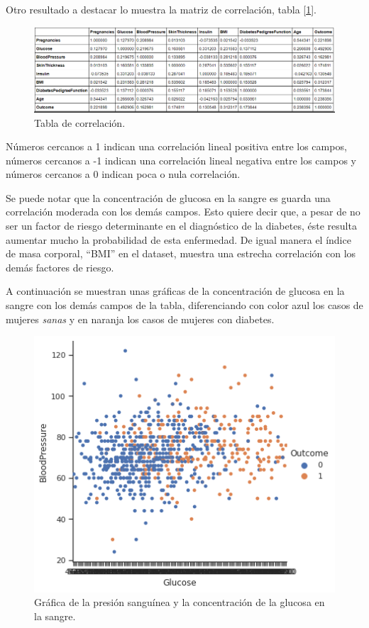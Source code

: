\documentclass{article}
\begin{document}
Otro resultado a destacar lo muestra la matriz de correlación, tabla [\ref{fig:corr}].

\begin{figure}[H]
	\centering
	\includegraphics[width=0.9\linewidth]{corr.png}
	\caption{Tabla de correlación.}%
	\label{fig:corr}
\end{figure}

Números cercanos a 1 indican una correlación lineal positiva entre los campos, números cercanos a -1 indican una correlación lineal negativa entre los campos y números cercanos a 0 indican poca o nula correlación.

Se puede notar que la concentración de glucosa en la sangre es guarda una correlación moderada con los demás campos. Esto quiere decir que, a pesar de no ser un factor de riesgo determinante en el diagnóstico de la diabetes, éste resulta aumentar mucho la probabilidad de esta enfermedad. De igual manera el índice de masa corporal, ``BMI'' en el dataset, muestra una estrecha correlación con los demás factores de riesgo. 

A continuación se muestran unas gráficas de la concentración de glucosa en la sangre con los demás campos de la tabla, diferenciando con color azul los casos de mujeres \emph{sanas} y en naranja los casos de mujeres con diabetes.

\begin{figure}[H]
	\centering
	\includegraphics[width=0.65\linewidth]{BloodPressure_Glucose.png}
	\caption{Gráfica de la presión sanguínea y la concentración de la glucosa en la sangre.}%
	\label{fig:BloodPressure_Glucose}
\end{figure}
\end{document}
